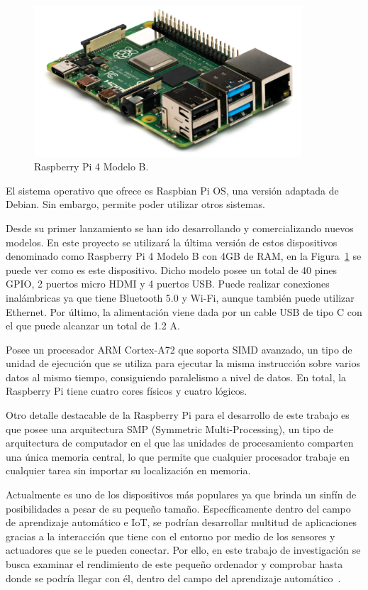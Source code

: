 \documentclass[a4paper, 12pt]{book}
\begin{document}
\begin{figure}[htb]
  \centering
  \includegraphics[width=10cm, keepaspectratio]{img/real_raspberry.png}
  \caption{Raspberry Pi 4 Modelo B.}\label{fig:raspberry_pi}
\end{figure}

El sistema operativo que ofrece es Raspbian Pi OS, una versión adaptada de Debian. Sin embargo, permite poder utilizar otros sistemas.

Desde su primer lanzamiento se han ido desarrollando y comercializando nuevos modelos. En este proyecto se utilizará la última versión de estos dispositivos denominado como Raspberry Pi 4 Modelo B con 4GB de RAM, en la Figura~\ref{fig:raspberry_pi} se puede ver como es este dispositivo. Dicho modelo posee un total de 40 pines GPIO, 2 puertos micro HDMI y 4 puertos USB. Puede realizar conexiones inalámbricas ya que tiene Bluetooth 5.0 y Wi-Fi, aunque también puede utilizar Ethernet. Por último, la alimentación viene dada por un cable USB de tipo C con el que puede alcanzar un total de 1.2 A.

Posee un procesador ARM Cortex-A72 que soporta SIMD avanzado, un tipo de unidad de ejecución que se utiliza para ejecutar la misma instrucción sobre varios datos al mismo tiempo, consiguiendo paralelismo a nivel de datos. En total, la Raspberry Pi tiene cuatro cores físicos y cuatro lógicos. 

Otro detalle destacable de la Raspberry Pi para el desarrollo de este trabajo es que posee una arquitectura SMP (Symmetric Multi-Processing), un tipo de arquitectura de computador en el que las unidades de procesamiento comparten una única memoria central, lo que permite que cualquier procesador trabaje en cualquier tarea sin importar su localización en memoria. 

Actualmente es uno de los dispositivos más populares ya que brinda un sinfín de posibilidades a pesar de su pequeño tamaño. Específicamente dentro del campo de aprendizaje automático e IoT, se podrían desarrollar multitud de aplicaciones gracias a la interacción que tiene con el entorno por medio de los sensores y actuadores que se le pueden conectar. Por ello, en este trabajo de investigación se busca examinar el rendimiento de este pequeño ordenador y comprobar hasta donde se podría llegar con él, dentro del campo del aprendizaje automático~\cite{Garcia-Martin2019}. 
\end{document}

